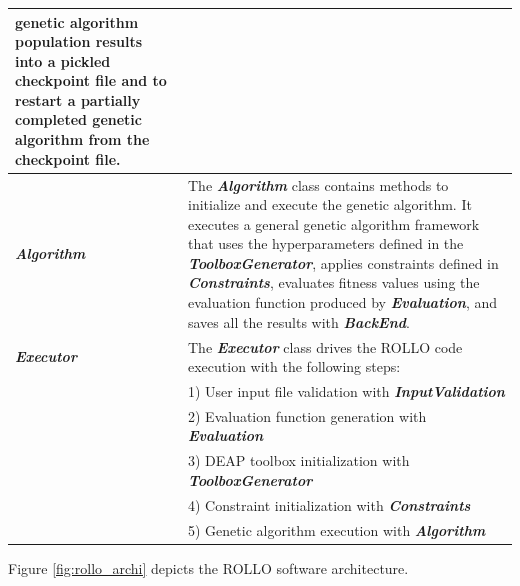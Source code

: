 \begin{table}[]
\begin{tabular}{l|p{}}
    genetic algorithm population results into a pickled checkpoint file and to 
    restart a partially completed genetic algorithm from the checkpoint file. \\
    \hline
    \textbf{\textit{Algorithm}} & The \textbf{\textit{Algorithm}} class contains methods to 
    initialize and execute the genetic algorithm. It executes a general genetic 
    algorithm framework that uses the hyperparameters defined in the 
    \textbf{\textit{ToolboxGenerator}}, applies constraints defined in
    \textbf{\textit{Constraints}}, evaluates fitness values using the evaluation 
    function produced by \textbf{\textit{Evaluation}}, and saves all the results 
    with \textbf{\textit{BackEnd}}. \\
    \hline
    \textbf{\textit{Executor}} & The \textbf{\textit{Executor}} class drives the \gls{ROLLO} code
    execution with the following steps: \\
    & 1) User input file validation with \textbf{\textit{InputValidation}} \\
    & 2) Evaluation function generation with \textbf{\textit{Evaluation}} \\
    & 3) \gls{DEAP} toolbox initialization with \textbf{\textit{ToolboxGenerator}} \\ 
    & 4) Constraint initialization with \textbf{\textit{Constraints}} \\ 
    & 5) Genetic algorithm execution with \textbf{\textit{Algorithm}} \\
    \hline
    \end{tabular}
    \end{table}
Figure \ref{fig:rollo_archi} depicts the \gls{ROLLO} software architecture. 
